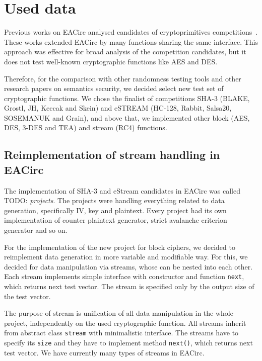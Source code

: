 \documentclass[
  print, %
  Table,   %
  nolof,     %
  nolot,     %
  11pt, %
  oneside  %
]{fithesis3}
\newcommand{\todo}[1]{TODO: \textit{#1}}
\begin{document}
\section{Used data}
\label{sec:method-data}

Previous works on EACirc analysed candidates of cryptoprimitives competitions~\cite{estreamMgrThesis,sha3Thesis,ukropMgrThesis}. These works extended EACirc by many functions sharing the same interface. This approach was effective for broad analysis of the competition candidates, but it does not test well-known cryptographic functions like AES and DES.

Therefore, for the comparison with other randomness testing tools and other research papers on semantics security, we decided select new test set of cryptographic functions. We chose the finalist of competitions SHA-3 (BLAKE, Grostl, JH, Keccak and Skein) and eSTREAM (HC-128, Rabbit, Salsa20, SOSEMANUK and Grain), and above that, we implemented other block (AES, DES, 3-DES and TEA) and stream (RC4) functions.

\subsection{Reimplementation of stream handling in EACirc}
\label{subsec:method-data-streams}

The implementation of SHA-3 and eStream candidates in EACirc was called \todo{projects}. The projects were handling everything related to data generation, specifically IV, key and plaintext. Every project had its own implementation of counter plaintext generator, strict avalanche criterion generator and so on.

For the implementation of the new project for block ciphers, we decided to reimplement data generation in more variable and modifiable way. For this, we decided for data manipulation via streams, whose can be nested into each other. Each stream implements simple interface with constructor and function \texttt{next}, which returns next test vector. The stream is specified only by the output size of the test vector.

The purpose of stream is unification of all data manipulation in the whole project, independently on the used cryptographic function. All streams inherit from abstract class \texttt{stream} with minimalistic interface. The streams have to specify its \texttt{size} and they have to implement method \texttt{next()}, which returns next test vector. We have currently many types of streams in EACirc.
\end{document}
